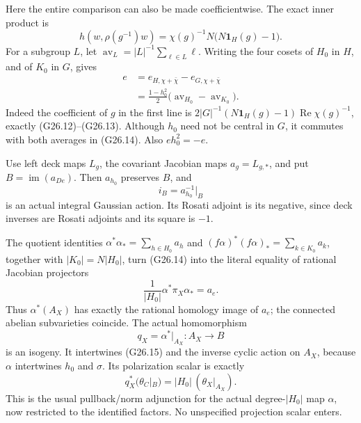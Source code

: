 Here the entire comparison can also be made coefficientwise.
The exact inner product is
\[
 h(w,\rho(g^{-1})w)
       =\chi(g)^{-1}N\bigl(N\boldsymbol1_H(g)-1\bigr).
                                                               \tag{G26.13}
\]
For a subgroup \(L\), let
\(\operatorname{av}_L=|L|^{-1}\sum_{\ell\in L}\ell\).
Writing the four cosets of \(H_0\) in \(H\), and of
\(K_0\) in \(G\), gives
\[
 \begin{split}
 e&=e_{H,\chi+\bar\chi}-e_{G,\chi+\bar\chi}\\
  &=\frac{1-h_0^2}{2}
                \bigl(\operatorname{av}_{H_0}
                               -\operatorname{av}_{K_0}\bigr).
 \end{split}                                                   \tag{G26.14}
\]
Indeed the coefficient of \(g\) in the first line is
\(2|G|^{-1}(N\boldsymbol1_H(g)-1)
\operatorname{Re}\chi(g)^{-1}\), exactly (G26.12)--(G26.13).
Although \(h_0\) need not be central in \(G\), it
commutes with both averages in (G26.14). Also \(eh_0^2=-e\).

Use left deck maps \(L_g\), the covariant Jacobian maps
\(a_g=L_{g,*}\), and put \(B=\operatorname{im}(a_{De})\).
Then \(a_{h_0}\) preserves \(B\), and
\[
                          i_B=a_{h_0}^{-1}|_B             \tag{G26.15}
\]
is an actual integral Gaussian action. Its Rosati adjoint
is its negative, since deck inverses are Rosati adjoints
and its square is \(-1\).

The quotient identities
\(\alpha^*\alpha_*=\sum_{h\in H_0}a_h\) and
\((f\alpha)^*(f\alpha)_*=\sum_{k\in K_0}a_k\), together
with \(|K_0|=N|H_0|\), turn (G26.14) into the literal
equality of rational Jacobian projectors
\[
                \frac1{|H_0|}\alpha^*\pi_X\alpha_*=a_e.
                                                               \tag{G26.16}
\]
Thus \(\alpha^*(A_X)\) has exactly the rational homology
image of \(a_e\); the connected abelian subvarieties coincide.
The actual homomorphism
\[
                  q_X=\alpha^*|_{A_X}:A_X\longrightarrow B
                                                               \tag{G26.17}
\]
is an isogeny. It intertwines (G26.15) and the inverse cyclic
action on \(A_X\), because \(\alpha\) intertwines \(h_0\)
and \(\sigma\). Its polarization scalar is exactly
\[
             q_X^*(\theta_C|_B)
                        =|H_0|\,(\theta_X|_{A_X}).        \tag{G26.18}
\]
This is the usual pullback/norm adjunction for the actual
degree-\(|H_0|\) map \(\alpha\), now restricted to the
identified factors. No unspecified projection scalar enters.

